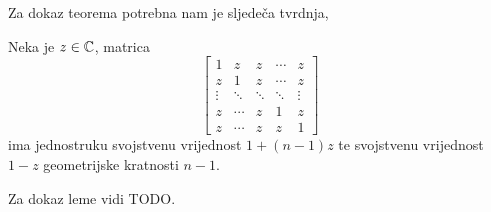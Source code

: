 \documentclass[a4paper,twoside,12pt]{memoir} %
\begin{document}
Za dokaz teorema potrebna nam je sljede\v{c}a tvrdnja,
\begin{lem}\label{lem:5:11}
    Neka je $z \in \mathbb{C}$, matrica 
    \begin{equation*}
        \begin{bmatrix*}
            1 & z & z & \cdots & z \\
            z & 1 & z & \cdots & z \\
            \vdots & \ddots & \ddots & \ddots & \vdots \\ 
            z & \cdots & z & 1 & z \\
            z & \cdots & z & z & 1 
        \end{bmatrix*}
    \end{equation*}
    ima jednostruku svojstvenu vrijednost $1+(n-1)z$ te svojstvenu vrijednost $1-z$ geometrijske kratnosti $n-1$.
\end{lem}
\noindentj Za dokaz leme vidi TODO.
\end{document}

